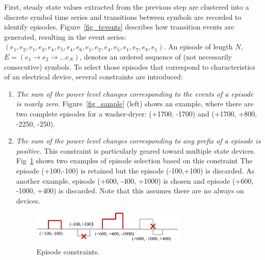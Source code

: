 First, steady
state values extracted from the previous
step are clustered into a discrete symbol time series and transitions between
symbols are recorded to identify episodes.
Figure~\ref{fig_tevents} describes how transition events are generated,
resulting in the event series:
$(e_1, e_2, e_1, e_2, e_4, e_5, e_4, e_6, e_1, e_2, e_4, e_5, e_1, e_7, e_8, e_1)$.
An episode of length $N$,
$E=(e_1 \rightarrow e_2 \rightarrow...e_N)$,
denotes an ordered sequence of (not necessarily consecutive) symbols.
To select those episodes that correspond to characteristics of an electrical device,
several constraints are introduced:
\begin{enumerate}
\item {\it The sum of the power level changes corresponding to
the events of a episode is nearly zero.}
Figure~\ref{fig_sample} (left) shows an example, where there
are two complete episodes for a washer-dryer:
(+1700, -1700) and (+1700, +800, -2250, -250).
\item {\it The sum of the power level changes corresponding to any
prefix of a episode is positive.} This constraint is particularly geared
toward multiple state devices.
Fig~\ref{fig_cst} shows two examples of episode selection
based on this constraint
The episode (+100,-100) is retained but the episode (-100,+100) is discarded.
As another example, episode (+600, -400, +1000)
is chosen and episode (+600, -1000, +400) is discarded. Note that this assumes
there are no always on devices.

\begin{figure}[!hbtp]
\centering
\includegraphics[width=0.7\textwidth]{disaggfigs/cst.png}
\caption{Episode constraints.}
\label{fig_cst}
\end{figure}



\end{enumerate}
